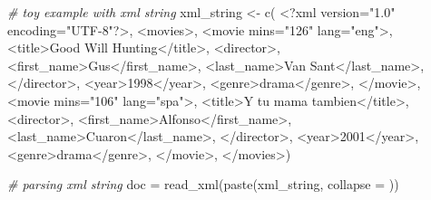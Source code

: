 \documentclass[
]{book}
\newenvironment{Shaded}{\begin{snugshade}}{\end{snugshade}}
\newcommand{\AttributeTok}[1]{\textcolor[rgb]{0.77,0.63,0.00}{#1}}
\newcommand{\CommentTok}[1]{\textcolor[rgb]{0.56,0.35,0.01}{\textit{#1}}}
\newcommand{\FunctionTok}[1]{\textcolor[rgb]{0.00,0.00,0.00}{#1}}
\newcommand{\NormalTok}[1]{#1}
\newcommand{\OtherTok}[1]{\textcolor[rgb]{0.56,0.35,0.01}{#1}}
\newcommand{\StringTok}[1]{\textcolor[rgb]{0.31,0.60,0.02}{#1}}
\begin{document}
\begin{Shaded}
\begin{Highlighting}[]
\CommentTok{\# toy example with xml string}
\NormalTok{xml\_string }\OtherTok{\textless{}{-}} \FunctionTok{c}\NormalTok{(}
  \StringTok{\textquotesingle{}\textless{}?xml version="1.0" encoding="UTF{-}8"?\textgreater{}\textquotesingle{}}\NormalTok{,}
  \StringTok{\textquotesingle{}\textless{}movies\textgreater{}\textquotesingle{}}\NormalTok{,}
  \StringTok{\textquotesingle{}\textless{}movie mins="126" lang="eng"\textgreater{}\textquotesingle{}}\NormalTok{,}
  \StringTok{\textquotesingle{}\textless{}title\textgreater{}Good Will Hunting\textless{}/title\textgreater{}\textquotesingle{}}\NormalTok{,}
  \StringTok{\textquotesingle{}\textless{}director\textgreater{}\textquotesingle{}}\NormalTok{,}
  \StringTok{\textquotesingle{}\textless{}first\_name\textgreater{}Gus\textless{}/first\_name\textgreater{}\textquotesingle{}}\NormalTok{,}
  \StringTok{\textquotesingle{}\textless{}last\_name\textgreater{}Van Sant\textless{}/last\_name\textgreater{}\textquotesingle{}}\NormalTok{,}
  \StringTok{\textquotesingle{}\textless{}/director\textgreater{}\textquotesingle{}}\NormalTok{,}
  \StringTok{\textquotesingle{}\textless{}year\textgreater{}1998\textless{}/year\textgreater{}\textquotesingle{}}\NormalTok{,}
  \StringTok{\textquotesingle{}\textless{}genre\textgreater{}drama\textless{}/genre\textgreater{}\textquotesingle{}}\NormalTok{,}
  \StringTok{\textquotesingle{}\textless{}/movie\textgreater{}\textquotesingle{}}\NormalTok{,}
  \StringTok{\textquotesingle{}\textless{}movie mins="106" lang="spa"\textgreater{}\textquotesingle{}}\NormalTok{,}
  \StringTok{\textquotesingle{}\textless{}title\textgreater{}Y tu mama tambien\textless{}/title\textgreater{}\textquotesingle{}}\NormalTok{,}
  \StringTok{\textquotesingle{}\textless{}director\textgreater{}\textquotesingle{}}\NormalTok{,}
  \StringTok{\textquotesingle{}\textless{}first\_name\textgreater{}Alfonso\textless{}/first\_name\textgreater{}\textquotesingle{}}\NormalTok{,}
  \StringTok{\textquotesingle{}\textless{}last\_name\textgreater{}Cuaron\textless{}/last\_name\textgreater{}\textquotesingle{}}\NormalTok{,}
  \StringTok{\textquotesingle{}\textless{}/director\textgreater{}\textquotesingle{}}\NormalTok{,}
  \StringTok{\textquotesingle{}\textless{}year\textgreater{}2001\textless{}/year\textgreater{}\textquotesingle{}}\NormalTok{,}
  \StringTok{\textquotesingle{}\textless{}genre\textgreater{}drama\textless{}/genre\textgreater{}\textquotesingle{}}\NormalTok{,}
  \StringTok{\textquotesingle{}\textless{}/movie\textgreater{}\textquotesingle{}}\NormalTok{,}
  \StringTok{\textquotesingle{}\textless{}/movies\textgreater{}\textquotesingle{}}\NormalTok{)}

\CommentTok{\# parsing xml string}
\NormalTok{doc }\OtherTok{=} \FunctionTok{read\_xml}\NormalTok{(}\FunctionTok{paste}\NormalTok{(xml\_string, }\AttributeTok{collapse =} \StringTok{\textquotesingle{}\textquotesingle{}}\NormalTok{))}
\end{Highlighting}
\end{Shaded}
\end{document}
